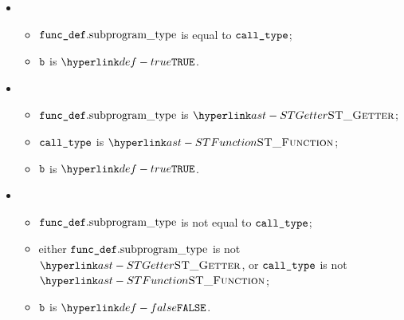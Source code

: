 \ProseParagraph
\OneApplies
\begin{itemize}
  \item {}
  \begin{itemize}
    \item $\funcdef.\funcsubprogramtype$ is equal to $\calltype$;
    \item $\vb$ is $\True$.
  \end{itemize}

  \item {}
  \begin{itemize}
    \item $\funcdef.\funcsubprogramtype$ is $\STGetter$;
    \item $\calltype$ is $\STFunction$;
    \item $\vb$ is $\True$.
  \end{itemize}

  \item {}
  \begin{itemize}
    \item $\funcdef.\funcsubprogramtype$ is not equal to $\calltype$;
    \item either $\funcdef.\funcsubprogramtype$ is not $\STGetter$, or $\calltype$ is not $\STFunction$;
    \item $\vb$ is $\False$.
  \end{itemize}
\end{itemize}

\FormallyParagraph
\begin{mathpar}
\end{mathpar}

\begin{mathpar}
\end{mathpar}

\begin{mathpar}
\end{mathpar}

